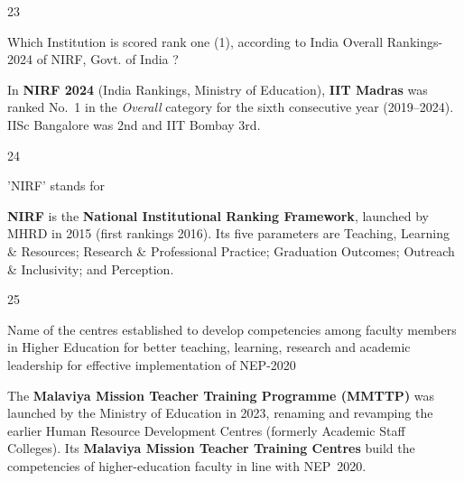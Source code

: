 \begin{question}{23}
{Which Institution is scored rank one (1), according to India Overall Rankings-2024 of NIRF, Govt. of India ?\par}
\begin{explain}
In \textbf{NIRF 2024} (India Rankings, Ministry of Education), \textbf{IIT Madras} was ranked No.~1 in the \emph{Overall} category for the sixth consecutive year (2019--2024). IISc Bangalore was 2nd and IIT Bombay 3rd.
\end{explain}
\end{question}

\begin{question}{24}
{'NIRF' stands for\par}
\begin{explain}
\textbf{NIRF} is the \textbf{National Institutional Ranking Framework}, launched by MHRD in 2015 (first rankings 2016). Its five parameters are Teaching, Learning \& Resources; Research \& Professional Practice; Graduation Outcomes; Outreach \& Inclusivity; and Perception.
\end{explain}
\end{question}

\begin{question}{25}
{Name of the centres established to develop competencies among faculty members in Higher Education for better teaching, learning, research and academic leadership for effective implementation of NEP-2020\par}
\begin{explain}
The \textbf{Malaviya Mission Teacher Training Programme (MMTTP)} was launched by the Ministry of Education in 2023, renaming and revamping the earlier Human Resource Development Centres (formerly Academic Staff Colleges). Its \textbf{Malaviya Mission Teacher Training Centres} build the competencies of higher-education faculty in line with NEP~2020.
\end{explain}
\end{question}

